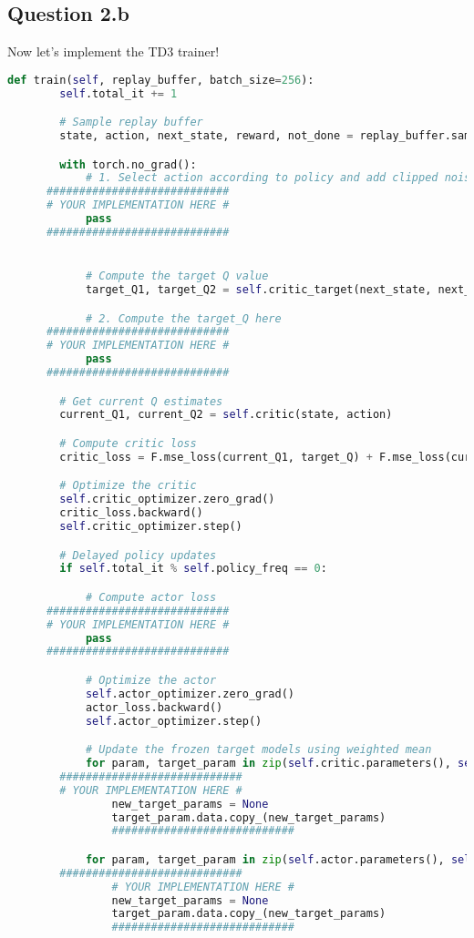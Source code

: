 \documentclass[12pt]{article}
\begin{document}
\subsection*{Question 2.b}
Now let's implement the TD3 trainer!
\begin{solution}
\begin{lstlisting}[language=Python]
def train(self, replay_buffer, batch_size=256):
		self.total_it += 1

		# Sample replay buffer
		state, action, next_state, reward, not_done = replay_buffer.sample(batch_size)

		with torch.no_grad():
			# 1. Select action according to policy and add clipped noise.
      ############################
      # YOUR IMPLEMENTATION HERE #
			pass
      ############################


			# Compute the target Q value
			target_Q1, target_Q2 = self.critic_target(next_state, next_action)

			# 2. Compute the target_Q here
      ############################
      # YOUR IMPLEMENTATION HERE #
			pass
      ############################

		# Get current Q estimates
		current_Q1, current_Q2 = self.critic(state, action)

		# Compute critic loss
		critic_loss = F.mse_loss(current_Q1, target_Q) + F.mse_loss(current_Q2, target_Q)

		# Optimize the critic
		self.critic_optimizer.zero_grad()
		critic_loss.backward()
		self.critic_optimizer.step()

		# Delayed policy updates
		if self.total_it % self.policy_freq == 0:

			# Compute actor loss
      ############################
      # YOUR IMPLEMENTATION HERE #
			pass
      ############################

			# Optimize the actor
			self.actor_optimizer.zero_grad()
			actor_loss.backward()
			self.actor_optimizer.step()

			# Update the frozen target models using weighted mean
			for param, target_param in zip(self.critic.parameters(), self.critic_target.parameters()):
      	############################
      	# YOUR IMPLEMENTATION HERE #
				new_target_params = None
				target_param.data.copy_(new_target_params)
				############################

			for param, target_param in zip(self.actor.parameters(), self.actor_target.parameters()):
      	############################
				# YOUR IMPLEMENTATION HERE #
				new_target_params = None
				target_param.data.copy_(new_target_params)
				############################
\end{lstlisting}
\end{solution}
\end{document}
